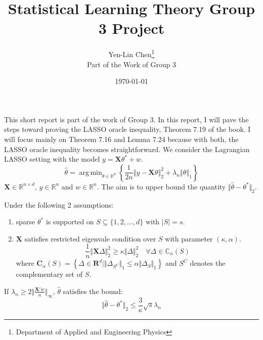 \documentclass[a4paper, 11pt]{article}
\title{Statistical Learning Theory Group 3 Project}
\date{\today}
\author{Yen-Lin Chen\thanks{Department of Applied and Engineering Physics}\\ Part of the Work of Group 3}
\DeclareMathOperator*{\argmin}{arg\,min}
\begin{document}
\maketitle

This short report is part of the work of Group 3. In this report, I will pave the steps toward proving the LASSO oracle inequality, Theorem 7.19 of the book. I will focus mainly on Theorem 7.16 and Lemma 7.24 because with both, the LASSO oracle inequality becomes straightforward. We consider the Lagrangian LASSO setting with the model $y = \mathbf{X}\theta^* + w$. 
\begin{equation}
\hat{\theta} = \argmin_{\theta\in\mathbb{R}^d}\left\{ \frac{1}{2n} \left\Vert y-\mathbf{X}\theta \right\Vert_2^2 +\lambda_n\left\Vert \theta \right\Vert_1 \right\}
\end{equation}
$\mathbf{X}\in\mathbb{R}^{n\times d}$, $y\in\mathbb{R}^n$ and $w\in\mathbb{R}^n$. The aim is to upper bound the quantity $\Vert\hat{\theta}-\theta^* \Vert_2$. \\


\begin{customthm}{7.13}
Under the following 2 assumptions: 
\begin{enumerate}
\item sparse $\theta^*$ is supported on $S\subseteq\{1,2,\dots, d\}$ with $\vert S \vert = s$.
\item $\mathbf{X}$ satisfies restricted eigenvale condition over $S$ with parameter $(\kappa, \alpha)$. 
\begin{equation}
\frac{1}{n}\Vert\mathbf{X}\Delta\Vert_2^2 \geq \kappa\Vert\Delta\Vert_2^2 \quad \forall \Delta \in \mathbb{C}_\alpha(S)
\end{equation}
where $\mathbf{C}_\alpha(S) = \left\{ \Delta\in\mathbf{R}^d \vert \Vert \Delta_{S^C} \Vert_1 \leq \alpha\Vert \Delta_S\Vert_1 \right\}$ and $S^C$ denotes the complementary set of $S$. 
\end{enumerate}

If $\lambda_n \geq 2 \Vert\frac{\mathbf{X}'w}{n} \Vert_\infty$, $\hat{\theta}$ satisfies the bound: 
\begin{equation}
\Vert\hat{\theta}-\theta^* \Vert_2 \leq\frac{3}{\kappa}\sqrt{s}\lambda_n
\end{equation}
\end{customthm}
\end{document}
